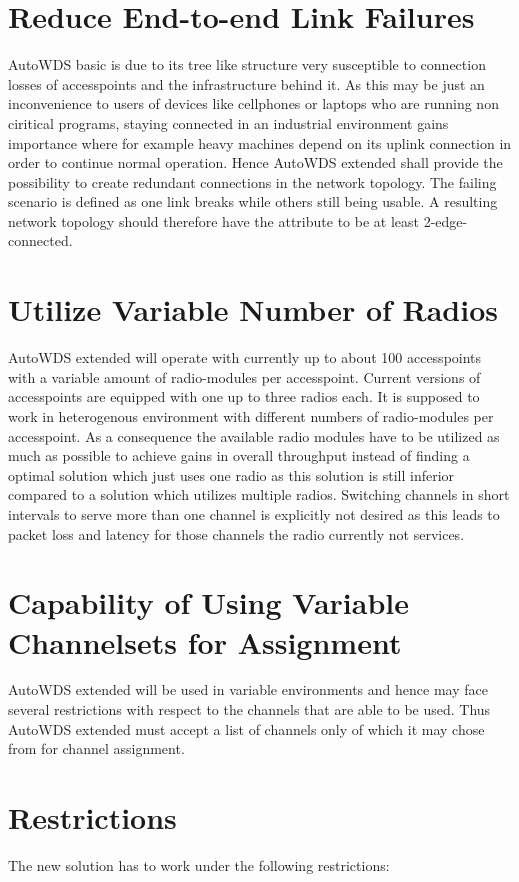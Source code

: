   \section{Reduce End-to-end Link Failures}
  AutoWDS basic is due to its tree like structure very susceptible to connection losses of accesspoints and the infrastructure behind it.
  As this may be just an inconvenience to users of devices like cellphones or laptops who are running non ciritical programs, 
  staying connected in an industrial environment gains importance where for example heavy machines depend on its uplink connection in order 
  to continue normal operation. Hence AutoWDS extended shall provide the possibility to create 
  redundant connections in the network topology. The failing scenario is defined as one link breaks while others still being usable.
  A resulting network topology should therefore have the attribute to be at least 2-edge-connected.
  
  \section{Utilize Variable Number of Radios}
  AutoWDS extended will operate with currently up to about 100 accesspoints with a variable amount of radio-modules per accesspoint.
  Current versions of accesspoints are equipped with one up to three radios each. It is supposed to work in heterogenous environment with 
  different numbers of radio-modules per accesspoint. As a consequence the available radio modules 
  have to be utilized as much as possible to achieve gains in overall throughput instead of finding a optimal solution which just uses one radio as this solution is
  still inferior compared to a solution which utilizes multiple radios.
  Switching channels in short intervals to serve more than one channel is explicitly not desired as this leads to packet loss and latency for those channels the radio
  currently not services.
  
  \section{Capability of Using Variable Channelsets for Assignment}
  AutoWDS extended will be used in variable environments and hence may face several restrictions with respect to the channels that are able to be used.
  Thus AutoWDS extended must accept a list of channels only of which it may chose from for channel assignment.
  
  \section{Restrictions}
    The new solution has to work under the following restrictions:
    
